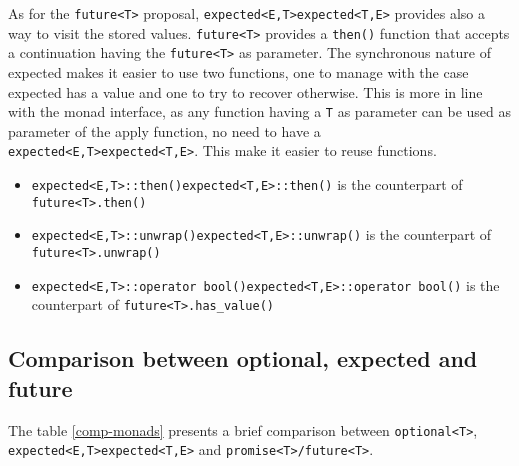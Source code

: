 \documentclass[a4paper,10pt]{article}
\newcommand{\cpp}[1]{\lstinline{#1}}
\newcommand{\suppress}[1]{\colorbox{suppress_color}{#1}}
\newcommand{\update}[1]{\colorbox{update_color}{#1}}
\begin{document}
As for the \cpp{future<T>} proposal, \suppress{\cpp{expected<E,T>}}\update{\cpp{expected<T,E>}} provides also a way to visit the stored values.
\cpp{future<T>} provides a \cpp{then()} function that accepts a continuation having the \cpp{future<T>} as parameter. The synchronous nature of expected makes it easier to use two functions, one to manage with the case expected has a value and one to try to recover otherwise. This is more in line with the monad interface, as any function having a \cpp{T} as parameter can be used as parameter of the apply function, no need to have a \suppress{\cpp{expected<E,T>}}\update{\cpp{expected<T,E>}}. This make it easier to reuse functions. 

\begin{itemize}
 \item \suppress{\cpp{expected<E,T>::then()}}\update{\cpp{expected<T,E>::then()}} is the counterpart of \cpp{future<T>.then()}
 \item \suppress{\cpp{expected<E,T>::unwrap()}}\update{\cpp{expected<T,E>::unwrap()}} is the counterpart of \cpp{future<T>.unwrap()}
 \item \suppress{\cpp{expected<E,T>::operator bool()}}\update{\cpp{expected<T,E>::operator bool()}} is the counterpart of \cpp{future<T>.has_value()}
\end{itemize}

\subsection{Comparison between optional, expected and future}

The table \ref{comp-monads} presents a brief comparison between \cpp{optional<T>}, \suppress{\cpp{expected<E,T>}}\update{\cpp{expected<T,E>}}  and \cpp{promise<T>/future<T>}.
\end{document}
